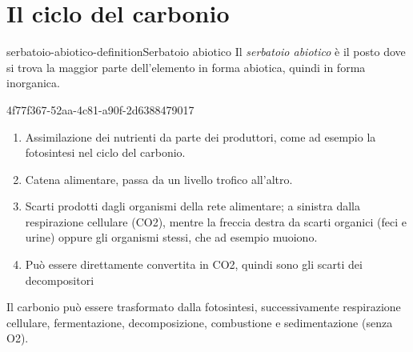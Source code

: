 \documentclass[preview]{standalone}
\begin{document}
\genpage

\section{Il ciclo del carbonio}

\begin{snippetdefinition}{serbatoio-abiotico-definition}{Serbatoio abiotico}
    Il \textit{serbatoio abiotico} 
    è il posto dove si trova la maggior parte dell'elemento in forma abiotica,
    quindi in forma inorganica.
\end{snippetdefinition}



\begin{snippet}{4f77f367-52aa-4c81-a90f-2d6388479017}
    \begin{enumerate}
        \item Assimilazione dei nutrienti da parte dei produttori, come ad esempio la fotosintesi nel ciclo del carbonio. 
        \item Catena alimentare, passa da un livello trofico all'altro. 
        \item Scarti prodotti dagli organismi della rete alimentare; a sinistra dalla respirazione cellulare (CO2), mentre la freccia destra da scarti organici (feci e urine) oppure gli organismi stessi, che ad esempio muoiono.
        \item Può essere direttamente convertita in CO2, quindi sono gli scarti dei decompositori
    \end{enumerate}
    
    Il carbonio può essere trasformato dalla fotosintesi, successivamente 
    respirazione cellulare, fermentazione, decomposizione, combustione e sedimentazione (senza O2).
\end{snippet}
\end{document}
